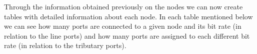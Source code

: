 Through the information obtained previously on the nodes we can now create tables with detailed information about each node. In each table mentioned below we can see how many ports are connected to a given node and its bit rate (in relation to the line ports) and how many ports are assigned to each different bit rate (in relation to the tributary ports).\\